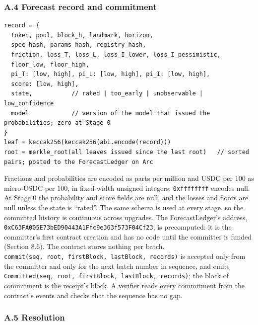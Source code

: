 \subsubsection{A.4 Forecast record and commitment}\label{a.4-forecast-record-and-commitment}

\begin{verbatim}
record = {
  token, pool, block_h, landmark, horizon,
  spec_hash, params_hash, registry_hash,
  friction, loss_T, loss_L, loss_I_lower, loss_I_pessimistic,
  floor_low, floor_high,
  pi_T: [low, high], pi_L: [low, high], pi_I: [low, high],
  score: [low, high],
  state,           // rated | too_early | unobservable | low_confidence
  model            // version of the model that issued the probabilities; zero at Stage 0
}
leaf = keccak256(keccak256(abi.encode(record)))
root = merkle_root(all leaves issued since the last root)   // sorted pairs; posted to the ForecastLedger on Arc
\end{verbatim}

Fractions and probabilities are encoded as parts per million and USDC per 100 as micro-USDC per 100, in fixed-width unsigned integers; \texttt{0xffffffff} encodes null. At Stage 0 the probability and score fields are null, and the losses and floors are null unless the state is ``rated''. The same schema is used at every stage, so the committed history is continuous across upgrades. The ForecastLedger's address, \texttt{0xC63FA005E73bED90443A1Ffc9e363f573F04Cf23}, is precomputed: it is the committer's first contract creation and has no code until the committer is funded (Section 8.6). The contract stores nothing per batch. \texttt{commit(seq,\ root,\ firstBlock,\ lastBlock,\ records)} is accepted only from the committer and only for the next batch number in sequence, and emits \texttt{Committed(seq,\ root,\ firstBlock,\ lastBlock,\ records)}; the block of commitment is the receipt's block. A verifier reads every commitment from the contract's events and checks that the sequence has no gap.

\subsubsection{A.5 Resolution}\label{a.5-resolution}

